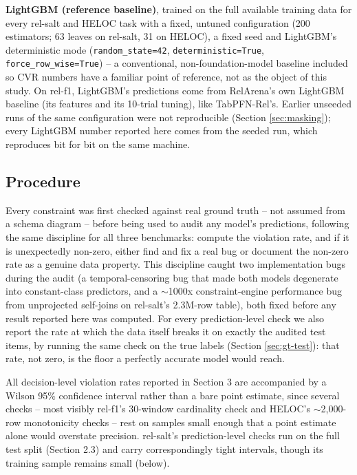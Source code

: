 \documentclass[11pt]{article}
\begin{document}
\textbf{LightGBM (reference baseline)}, trained on the full available training data for every
rel-salt and HELOC task with a fixed, untuned configuration (200 estimators; 63 leaves on
rel-salt, 31 on HELOC), a fixed seed and LightGBM's deterministic mode
(\texttt{random\_state=42}, \texttt{deterministic=True}, \texttt{force\_row\_wise=True}) -- a
conventional, non-foundation-model baseline included so CVR numbers have a familiar point of
reference, not as the object of this study. On rel-f1, LightGBM's predictions come from
RelArena's own LightGBM baseline (its features and its 10-trial tuning), like TabPFN-Rel's.
Earlier unseeded runs of the same configuration were not reproducible (Section
\ref{sec:masking}); every LightGBM number reported here comes from the seeded run, which
reproduces bit for bit on the same machine.

\subsection{Procedure}

Every constraint was first checked against real ground truth -- not assumed from a schema
diagram -- before being used to audit any model's predictions, following the same discipline
for all three benchmarks: compute the violation rate, and if it is unexpectedly non-zero,
either find and fix a real bug or document the non-zero rate as a genuine data property. This
discipline caught two implementation bugs during the audit (a temporal-censoring bug that made
both models degenerate into constant-class predictors, and a $\sim$1000x constraint-engine
performance bug from unprojected self-joins on rel-salt's 2.3M-row table), both fixed before
any result reported here was computed. For every prediction-level check we also report the rate
at which the data itself breaks it on exactly the audited test items, by running the same check
on the true labels (Section \ref{sec:gt-test}): that rate, not zero, is the floor a perfectly
accurate model would reach.

All decision-level violation rates reported in Section 3 are accompanied by a Wilson 95\%
confidence interval rather than a bare point estimate, since several checks -- most visibly
rel-f1's 30-window cardinality check and HELOC's $\sim$2{,}000-row monotonicity checks -- rest
on samples small enough that a point estimate alone would overstate precision. rel-salt's
prediction-level checks run on the full test split (Section 2.3) and carry correspondingly
tight intervals, though its training sample remains small (below).
\end{document}
